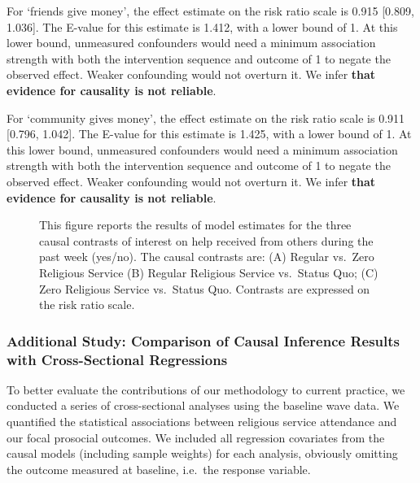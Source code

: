 \documentclass[
  single column]{article}
\begin{document}
For `friends give money', the effect estimate on the risk ratio scale is
0.915 {[}0.809, 1.036{]}. The E-value for this estimate is 1.412, with a
lower bound of 1. At this lower bound, unmeasured confounders would need
a minimum association strength with both the intervention sequence and
outcome of 1 to negate the observed effect. Weaker confounding would not
overturn it. We infer \textbf{that evidence for causality is not
reliable}.

For `community gives money', the effect estimate on the risk ratio scale
is 0.911 {[}0.796, 1.042{]}. The E-value for this estimate is 1.425,
with a lower bound of 1. At this lower bound, unmeasured confounders
would need a minimum association strength with both the intervention
sequence and outcome of 1 to negate the observed effect. Weaker
confounding would not overturn it. We infer \textbf{that evidence for
causality is not reliable}.

\begin{figure}


\caption{\label{fig-study_3}This figure reports the results of model
estimates for the three causal contrasts of interest on help received
from others during the past week (yes/no). The causal contrasts are: (A)
Regular vs.~Zero Religious Service (B) Regular Religious Service
vs.~Status Quo; (C) Zero Religious Service vs.~Status Quo. Contrasts are
expressed on the risk ratio scale.}

\end{figure}%

\newpage{}

\subsubsection{Additional Study: Comparison of Causal Inference Results
with Cross-Sectional
Regressions}\label{additional-study-comparison-of-causal-inference-results-with-cross-sectional-regressions}

To better evaluate the contributions of our methodology to current
practice, we conducted a series of cross-sectional analyses using the
baseline wave data. We quantified the statistical associations between
religious service attendance and our focal prosocial outcomes. We
included all regression covariates from the causal models (including
sample weights) for each analysis, obviously omitting the outcome
measured at baseline, i.e.~the response variable.
\end{document}
